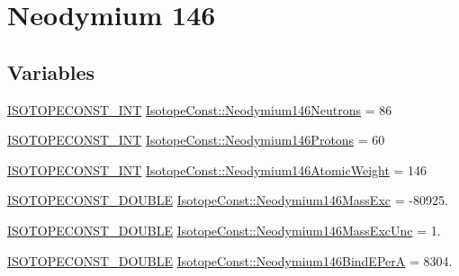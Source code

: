 \hypertarget{group___isotope_const-_neodymium-_nd146}{}\section{Neodymium 146}
\label{group___isotope_const-_neodymium-_nd146}
\subsection*{Variables}
\begin{DoxyCompactItemize}
\item 
\mbox{\hyperlink{group___isotope_const-_macros_ga5f18360b3e99483a35c32d789e62621c}{I\+S\+O\+T\+O\+P\+E\+C\+O\+N\+S\+T\+\_\+\+I\+NT}} \mbox{\hyperlink{group___isotope_const-_neodymium-_nd146_ga0d11a73debe8e95ddf4c01eb3d24c1e8}{Isotope\+Const\+::\+Neodymium146\+Neutrons}} = 86
\item 
\mbox{\hyperlink{group___isotope_const-_macros_ga5f18360b3e99483a35c32d789e62621c}{I\+S\+O\+T\+O\+P\+E\+C\+O\+N\+S\+T\+\_\+\+I\+NT}} \mbox{\hyperlink{group___isotope_const-_neodymium-_nd146_ga403c0f47b1d79414928f765e48c97a0c}{Isotope\+Const\+::\+Neodymium146\+Protons}} = 60
\item 
\mbox{\hyperlink{group___isotope_const-_macros_ga5f18360b3e99483a35c32d789e62621c}{I\+S\+O\+T\+O\+P\+E\+C\+O\+N\+S\+T\+\_\+\+I\+NT}} \mbox{\hyperlink{group___isotope_const-_neodymium-_nd146_gaf649a2a65597e1f76ec65e5efb7fab74}{Isotope\+Const\+::\+Neodymium146\+Atomic\+Weight}} = 146
\item 
\mbox{\hyperlink{group___isotope_const-_macros_ga8f45a7272ce02c0b4c65c44636ed719a}{I\+S\+O\+T\+O\+P\+E\+C\+O\+N\+S\+T\+\_\+\+D\+O\+U\+B\+LE}} \mbox{\hyperlink{group___isotope_const-_neodymium-_nd146_ga1db374dc4f7d1e57b5835d139591febb}{Isotope\+Const\+::\+Neodymium146\+Mass\+Exc}} = -\/80925.
\item 
\mbox{\hyperlink{group___isotope_const-_macros_ga8f45a7272ce02c0b4c65c44636ed719a}{I\+S\+O\+T\+O\+P\+E\+C\+O\+N\+S\+T\+\_\+\+D\+O\+U\+B\+LE}} \mbox{\hyperlink{group___isotope_const-_neodymium-_nd146_ga34d9c854ba72c7c3426de9d8b010bc96}{Isotope\+Const\+::\+Neodymium146\+Mass\+Exc\+Unc}} = 1.
\item 
\mbox{\hyperlink{group___isotope_const-_macros_ga8f45a7272ce02c0b4c65c44636ed719a}{I\+S\+O\+T\+O\+P\+E\+C\+O\+N\+S\+T\+\_\+\+D\+O\+U\+B\+LE}} \mbox{\hyperlink{group___isotope_const-_neodymium-_nd146_gadd0880f4a80509932399a5395282079a}{Isotope\+Const\+::\+Neodymium146\+Bind\+E\+PerA}} = 8304.
\item 

\end{DoxyCompactItemize}

